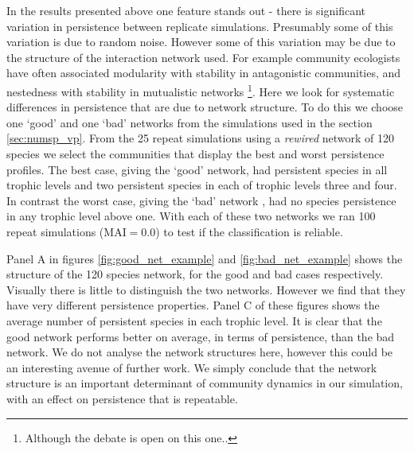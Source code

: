 In the results presented above one feature stands out - there is significant variation in persistence between replicate simulations. Presumably some of this variation is due to random noise. However some of this variation may be due to the structure of the interaction network used. For example community ecologists have  often associated modularity with stability in antagonistic communities, and nestedness with stability in mutualistic networks \cite{sauve2014structure}\footnote{Although the debate is open on this one..}. Here we look for systematic differences in persistence that are due to network structure. To do this we choose one `good' and one `bad' networks from the simulations used in the section \ref{sec:numsp_vp}. From the 25 repeat simulations using a \emph{rewired} network of 120 species we select the communities that display the best and worst persistence profiles. The best case, giving the `good' network, had persistent species in all trophic levels and two persistent species in each of trophic levels three and four. In contrast the worst case, giving the `bad' network   , had no species persistence in any trophic level above one. With each of these two networks we ran 100 repeat simulations (MAI$=0.0$) to test if the classification is reliable.  

Panel A in figures \ref{fig:good_net_example} and \ref{fig:bad_net_example} shows the structure of the 120 species network, for the good and bad cases respectively. Visually there is little to distinguish the two networks. However we find that they have very different persistence properties. Panel C of these figures shows the average number of persistent species in each trophic level. It is clear that the good network performs better on average, in terms of persistence, than the bad network. We do not analyse the network structures here, however this could be an interesting avenue of further work. We simply conclude that the network structure is an important determinant of community dynamics in our simulation, with an effect on persistence that is repeatable.  

%	
%	
%
%
%
%	
%

